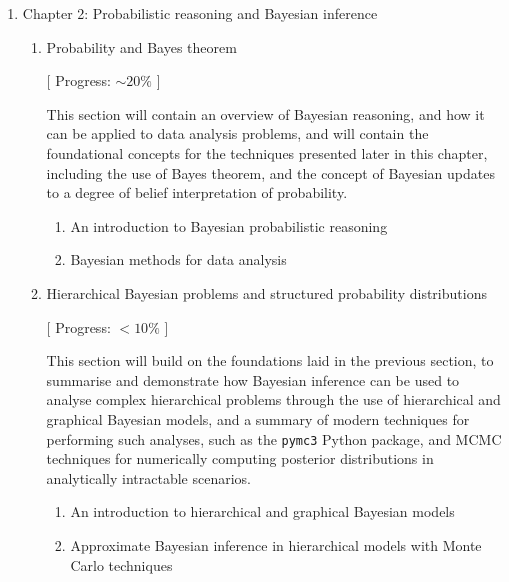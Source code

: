 \documentclass{kentigern}
\theoremstyle{definition}
\begin{document}
\begin{enumerate}
\begin{enumerate}
   [ Progress: $0\%$ ]

   Again, with the observation of a gravitational wave event, closely
   followed by a short gamma ray burst, GW170817, the first
   observation of a binary neutron star coalesence in gravitational
   waves, in summer 2017, marked a milestone in modern astrophysics,
   with the confirmation that at least some short gamma ray bursts are
   the result of binary neutron star coalesence. This section will
   contain a brief review of the literature surrounding this
   observation, and the astrophysical inferences which were possible
   as a result of its multimessenger nature, with specific focus on
   the connection between the GW event and the SGRB observation, given
   the contents of chapter 5.
   \begin{enumerate}
   \item Brief overview of GW170817
   \end{enumerate}
  \end{enumerate}

  
\item Chapter 2: Probabilistic reasoning and Bayesian inference
  \begin{enumerate}
\item Probability and Bayes theorem

  [ Progress: $\sim20\%$ ]

   This section will contain an overview of Bayesian reasoning, and
   how it can be applied to data analysis problems, and will contain
   the foundational concepts for the techniques presented later in
   this chapter, including the use of Bayes theorem, and the concept
   of Bayesian updates to a degree of belief interpretation of
   probability.
   \begin{enumerate}
   \item An introduction to Bayesian probabilistic reasoning    
   \item Bayesian methods for data analysis
   \end{enumerate}
   
\item Hierarchical Bayesian problems and structured probability distributions

  [ Progress: $<10\%$ ]
  
   This section will build on the foundations laid in the previous
   section, to summarise and demonstrate how Bayesian inference can be
   used to analyse complex hierarchical problems through the use of
   hierarchical and graphical Bayesian models, and a summary of modern
   techniques for performing such analyses, such as the \texttt{pymc3} Python
   package, and MCMC techniques for numerically computing posterior
   distributions in analytically intractable scenarios.
   \begin{enumerate}
     \item An introduction to hierarchical and graphical Bayesian models
     \item Approximate Bayesian inference in hierarchical models with Monte Carlo techniques
   \end{enumerate}


\end{enumerate}
\end{enumerate}
\end{document}
